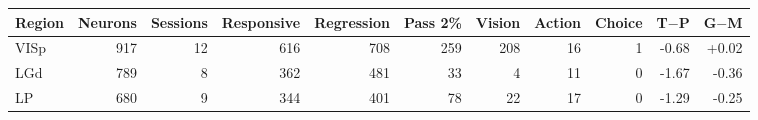 \begin{tabular}{@{}lrrrrrrrrrr@{}}
\toprule
Region & Neurons & Sessions & Responsive & Regression & Pass 2\% & Vision & Action & Choice & T$-$P & G$-$M \\
\midrule
VISp & 917 & 12 & 616 & 708 & 259 & 208 & 16 & 1 & -0.68 & +0.02 \\
LGd & 789 & 8 & 362 & 481 & 33 & 4 & 11 & 0 & -1.67 & -0.36 \\
LP & 680 & 9 & 344 & 401 & 78 & 22 & 17 & 0 & -1.29 & -0.25 \\
\bottomrule
\end{tabular}
